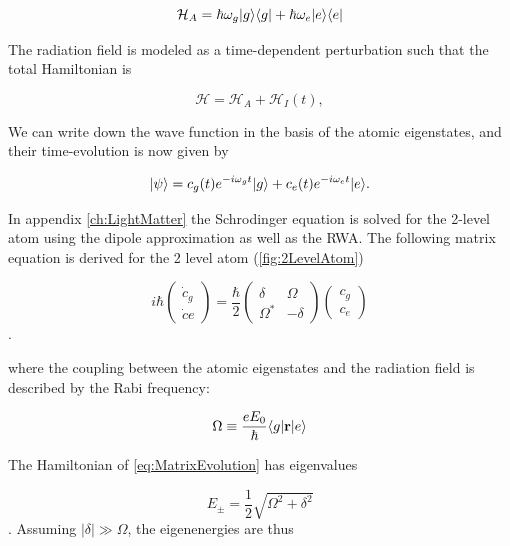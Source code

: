 \begin{equation}\label{eq:AtomHamiltonianMain}
	\mathcal{H}_A = \hbar \omega_g \lvert g\rangle\langle g\rvert + \hbar \omega_e \lvert e\rangle\langle e\rvert
\end{equation}

The radiation field is modeled as a time-dependent perturbation such that the total Hamiltonian is \cite{Leeuwen2017}

\begin{equation}\label{eq:PerturbationMain}
	\mathcal{H} = \mathcal{H}_A + \mathcal{H}_{I}(t),
\end{equation}

We can write down the wave function in the basis of the atomic eigenstates, and their time-evolution is now given by

\begin{equation}\label{eq:TwoLevelMain}
	\lvert\psi\rangle = c_g(t) e^{-i \omega_g t} \lvert g\rangle + c_e(t) e^{-i \omega_e t} \lvert e\rangle.
\end{equation}

In appendix \ref{ch:LightMatter} the Schrodinger equation is solved for the 2-level atom using the dipole approximation as well as the \acf*{RWA}. The following matrix equation is derived for the 2 level atom (\cref{fig:2LevelAtom}) \cite{Foot2005}

\begin{equation}\label{eq:MatrixEvolution}
	i \hbar \begin{pmatrix}
		\dot{c}_g \\ 
		\dot{c}e
	\end{pmatrix}
	= \frac{\hbar}{2} \begin{pmatrix}
		\delta & \Omega \\ \Omega^* & -\delta 
	\end{pmatrix} 
	\begin{pmatrix}
		c_g \\ c_e
	\end{pmatrix}
\end{equation}.

where the coupling between the atomic eigenstates and the radiation field is described by the Rabi frequency:

\begin{equation}\label{eq:RabiFrequencyMain}
	\Omega \equiv \frac{e E_0}{\hbar} \langle g\rvert\mathbf{r}\lvert e\rangle
\end{equation}

The Hamiltonian of \cref{eq:MatrixEvolution} has eigenvalues 

\begin{equation}\label{eq:EigenValues}
	E_{\pm} = 
	\frac{1}{2} \sqrt{\Omega^2+\delta^2}
\end{equation}. Assuming $|\delta| \gg \Omega$, the eigenenergies are thus 


